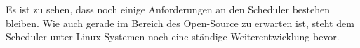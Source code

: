 \documentclass[ngerman]{seminarvorlage}
\begin{document}
Es ist zu sehen, dass noch einige Anforderungen an den Scheduler bestehen bleiben.
Wie auch gerade im Bereich des Open-Source zu erwarten ist, steht dem Scheduler unter Linux-Systemen noch eine ständige Weiterentwicklung bevor.  
	

\pagebreak

%
%


\end{document}
